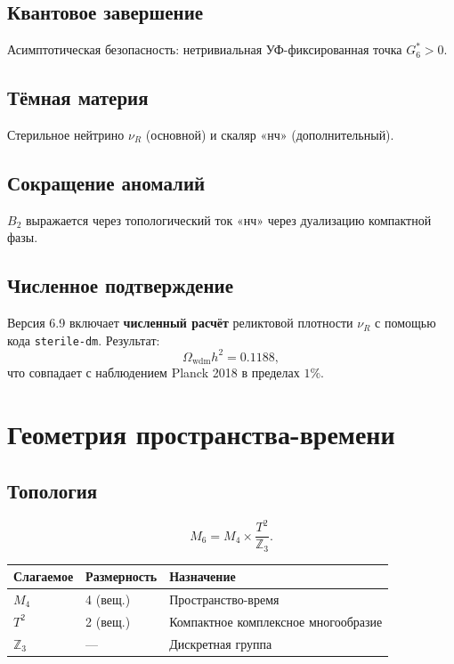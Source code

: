 \documentclass[11pt,letterpaper]{article}
\begin{document}
\subsection{Квантовое завершение}
Асимптотическая безопасность: нетривиальная УФ-фиксированная точка $G_6^* > 0$.

\subsection{Тёмная материя}
Стерильное нейтрино $\nu_R$ (основной) и скаляр «нч» (дополнительный).

\subsection{Сокращение аномалий}
$B_2$ выражается через топологический ток «нч» через дуализацию компактной фазы.

\subsection{Численное подтверждение}
Версия 6.9 включает \textbf{численный расчёт} реликтовой плотности $\nu_R$ с помощью кода \texttt{sterile-dm}. Результат:
\[
\Omega_{\text{wdm}} h^2 = 0.1188,
\]
что совпадает с наблюдением Planck 2018 в пределах $1\%$.

\section{Геометрия пространства-времени}

\subsection{Топология}
\begin{equation}
M_6 = M_4 \times \frac{T^2}{\mathbb{Z}_3} .
\end{equation}

\begin{table}[h!]
\centering
\begin{tabular}{lll}
\toprule
\textbf{Слагаемое} & \textbf{Размерность} & \textbf{Назначение} \\
\midrule
$M_4$ & 4 (вещ.) & Пространство-время \\
$T^2$ & 2 (вещ.) & Компактное комплексное многообразие \\
$\mathbb{Z}_3$ & --- & Дискретная группа \\
\bottomrule
\end{tabular}
\end{table}
\end{document}
